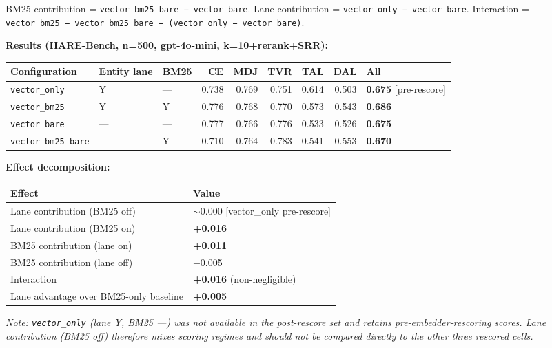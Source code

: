 \documentclass[
]{article}
\begin{document}
BM25 contribution = \texttt{vector\_bm25\_bare\ −\ vector\_bare}. Lane
contribution = \texttt{vector\_only\ −\ vector\_bare}. Interaction =
\texttt{vector\_bm25\ −\ vector\_bm25\_bare\ −\ (vector\_only\ −\ vector\_bare)}.

\textbf{Results (HARE-Bench, n=500, gpt-4o-mini, k=10+rerank+SRR):}

\begin{small}
\setlength{\tabcolsep}{4pt}
\begin{longtable}{p{1.6in}p{0.55in}p{0.55in}rrrrrl}
\toprule
\textbf{Configuration} & \textbf{Entity lane} & \textbf{BM25} & \textbf{CE} & \textbf{MDJ} & \textbf{TVR} & \textbf{TAL} & \textbf{DAL} & \textbf{All} \\
\midrule
\endhead
\texttt{vector\_only} & Y & — & 0.738 & 0.769 & 0.751 & 0.614 & 0.503 & \textbf{0.675} [pre-rescore] \\
\texttt{vector\_bm25} & Y & Y & 0.776 & 0.768 & 0.770 & 0.573 & 0.543 & \textbf{0.686} \\
\texttt{vector\_bare} & — & — & 0.777 & 0.766 & 0.776 & 0.533 & 0.526 & \textbf{0.675} \\
\texttt{vector\_bm25\_bare} & — & Y & 0.710 & 0.764 & 0.783 & 0.541 & 0.553 & \textbf{0.670} \\
\bottomrule
\end{longtable}
\end{small}

\textbf{Effect decomposition:}

\begin{small}
\setlength{\tabcolsep}{4pt}
\begin{longtable}{p{3.0in}p{3.0in}}
\toprule
\textbf{Effect} & \textbf{Value} \\
\midrule
\endhead
Lane contribution (BM25 off) & $\sim$0.000 [vector\_only pre-rescore] \\
Lane contribution (BM25 on) & \textbf{+0.016} \\
BM25 contribution (lane on) & \textbf{+0.011} \\
BM25 contribution (lane off) & $-$0.005 \\
Interaction & \textbf{+0.016} (non-negligible) \\
Lane advantage over BM25-only baseline & \textbf{+0.005} \\
\bottomrule
\end{longtable}
\end{small}

\emph{Note: \texttt{vector\_only} (lane Y, BM25 ---) was not available
in the post-rescore set and retains pre-embedder-rescoring scores. Lane
contribution (BM25 off) therefore mixes scoring regimes and should not
be compared directly to the other three rescored cells.}
\end{document}
